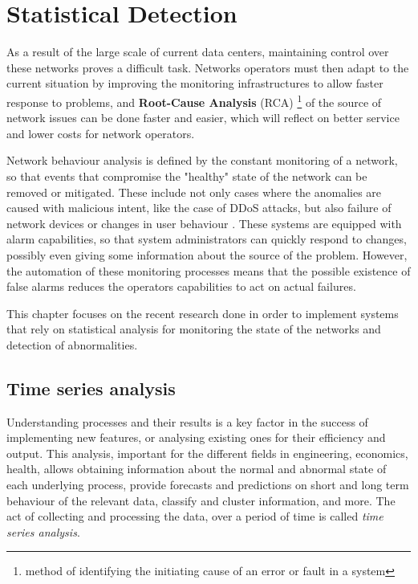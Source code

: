 \section{Statistical Detection} \label{chap:stat_det}

As a result of the large scale of current data centers, maintaining control over these networks proves a difficult task. Networks operators must then adapt to the
current situation by improving the monitoring infrastructures to allow faster response to problems, and \textbf{Root-Cause Analysis} (RCA) \footnote{method of
identifying the initiating cause of an error or fault in a system} of the source of network issues can be done faster and easier, which will reflect on better 
service and lower costs for network operators. 

\par Network behaviour analysis is defined by the constant monitoring of a network, so that events that compromise the "healthy" state of the network can be
removed or mitigated. These include not only cases where the anomalies are caused with malicious intent, like the case of DDoS attacks, but also failure of network 
devices or changes in user behaviour \cite{munz_traffic_2010}. These systems are equipped with alarm capabilities, so that system administrators can quickly respond
to changes, possibly even giving some information about the source of the problem. However, the automation of these monitoring processes means that the possible 
existence of false alarms reduces the operators capabilities to act on actual failures. 

\par This chapter focuses on the recent research done in order to implement systems that rely on statistical analysis for monitoring the state of the networks and
detection of abnormalities.

\subsection {Time series analysis}

Understanding processes and their results is a key factor in the success of implementing new features, or analysing existing ones for their efficiency and output.
This analysis, important for the different fields in engineering, economics, health, allows obtaining information about the normal and abnormal state of each 
underlying process, provide forecasts and predictions on short and long term behaviour of the relevant data, classify and cluster information, and more. The act of 
collecting and processing the data, over a period of time is called \textit{time series analysis}. 

